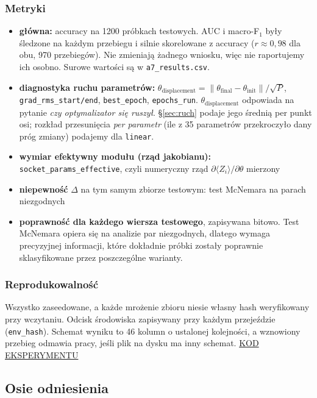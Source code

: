 \documentclass[11pt, a4paper]{article}
\begin{document}
\subsubsection{Metryki}\label{sec:siatka-metryki}
\begin{itemize}
    \item \textbf{główna:} accuracy na 1200 próbkach testowych. AUC i macro-F$_1$ były śledzone na każdym przebiegu i silnie skorelowane z accuracy ($r\approx0{,}98$ dla obu, 970 przebiegów). Nie zmieniają żadnego wniosku, więc nie raportujemy ich osobno. Surowe wartości są w \texttt{a7\_results.csv}.
    \item \textbf{diagnostyka ruchu parametrów:} $\theta_{\text{displacement}} = \|\theta_{\text{final}} - \theta_{\text{init}}\| / \sqrt{P}$, \texttt{grad\_rms\_start/end}, \texttt{best\_epoch}, \texttt{epochs\_run}. $\theta_{\text{displacement}}$ odpowiada na pytanie \emph{czy optymalizator się ruszył}. §\ref{sec:ruch} podaje jego średnią per punkt osi; rozkład przesunięcia \emph{per parametr} (ile z 35 parametrów przekroczyło dany próg zmiany) podajemy dla \texttt{linear}.
    \item \textbf{wymiar efektywny modułu (rząd jakobianu):} \texttt{socket\_params\_effective}, czyli numeryczny rząd $\partial\langle Z_i\rangle/\partial\theta$ mierzony
    \item \textbf{niepewność} $\Delta$ na tym samym zbiorze testowym: test McNemara na parach niezgodnych
\item \textbf{poprawność dla każdego wiersza testowego}, zapisywana bitowo. Test McNemara opiera się na analizie par niezgodnych, dlatego wymaga precyzyjnej informacji, które dokładnie próbki zostały poprawnie sklasyfikowane przez poszczególne warianty.
\end{itemize}

\subsubsection{Reprodukowalność}
Wszystko zaseedowane, a każde mrożenie zbioru niesie własny hash weryfikowany przy wczytaniu.
Odcisk środowiska zapisywany przy każdym przejeździe (\texttt{env\_hash}). 
Schemat wyniku to 46 kolumn o ustalonej kolejności, a wznowiony przebieg odmawia pracy, jeśli plik na dysku ma inny schemat. \href{https://github.com/zaduzohp/quantum_hybrids}{KOD EKSPERYMENTU}

\subsection{Osie odniesienia}
\end{document}
